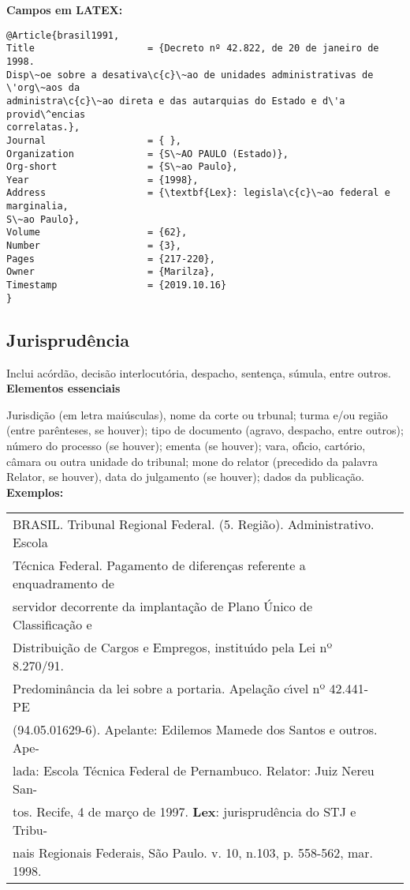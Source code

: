 \textbf{Campos em LATEX:} 


\begin{verbatim}
@Article{brasil1991,
Title                    = {Decreto nº 42.822, de 20 de janeiro de 1998. 
Disp\~oe sobre a desativa\c{c}\~ao de unidades administrativas de \'org\~aos da 
administra\c{c}\~ao direta e das autarquias do Estado e d\'a provid\^encias 
correlatas.},
Journal                  = { },
Organization             = {S\~AO PAULO (Estado)},
Org-short                = {S\~ao Paulo},
Year                     = {1998},
Address                  = {\textbf{Lex}: legisla\c{c}\~ao federal e marginalia, 
S\~ao Paulo},
Volume                   = {62},
Number                   = {3},
Pages                    = {217-220},
Owner                    = {Marilza},
Timestamp                = {2019.10.16}
}
\end{verbatim}
\subsection{Jurisprud\^encia}

Inclui ac\'ord\~ao, decis\~ao interlocut\'oria, despacho, senten\c{c}a, s\'umula, entre outros. \\

\textbf{Elementos essenciais}

Jurisdi\c{c}\~ao (em letra mai\'usculas), nome da corte ou trbunal; turma e/ou regi\~ao (entre par\^enteses, se houver); tipo de documento (agravo, despacho, entre outros); n\'umero do processo (se houver); ementa (se houver); vara, of\'{\i}cio, cart\'orio, c\^amara ou outra unidade do tribunal; mone do relator (precedido da palavra Relator, se houver), data do julgamento (se houver); dados da publica\c{c}\~ao. \\

\textbf{Exemplos:} \\


\begin{tabular}{|l|c|} \hline
	BRASIL. Tribunal Regional Federal. (5. Regi\~ao). Administrativo. Escola\\
	T\'ecnica Federal. Pagamento de diferen\c{c}as referente a enquadramento de \\
	servidor decorrente da implanta\c{c}\~ao de Plano \'Unico de Classifica\c{c}\~ao e \\
	Distribui\c{c}\~ao de Cargos e Empregos, institu\'{\i}do pela Lei nº 8.270/91. \\
	Predomin\^ancia da lei sobre a portaria. Apela\c{c}\~ao c\'{\i}vel nº 42.441-PE \\
	(94.05.01629-6). Apelante: Edilemos Mamede dos Santos e outros. Ape-\\
	lada: Escola T\'ecnica Federal de Pernambuco. Relator: Juiz Nereu San-\\
	tos. Recife, 4 de mar\c{c}o de 1997. \textbf{Lex}: jurisprud\^encia do STJ e Tribu-\\
	nais Regionais Federais, S\~ao Paulo. v. 10, n.103, p. 558-562, mar. 1998. \\\hline
\end{tabular} \\

